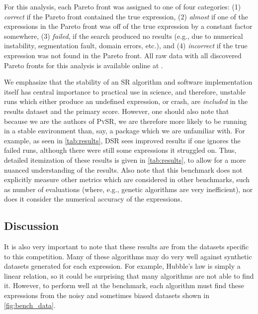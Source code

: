 \documentclass[letterpaper,twocolumn]{scrartcl}
\newcommand\pysr{\textsc{PySR}\xspace}
\begin{document}
\begin{linenumbers}
For this analysis, each Pareto front was assigned to one of four categories: (1) \textit{correct} if the Pareto front contained the true expression, (2) \textit{almost} if one of the expressions in the Pareto front was off of the true expression by a constant factor somewhere, (3) \textit{failed}, if the search produced no results (e.g., due to numerical instability, segmentation fault, domain errors, etc.), and (4) \textit{incorrect} if the true expression was not found in the Pareto front.
All raw data with all discovered Pareto fronts for this analysis is available online at .



We emphasize that the stability of an SR algorithm and software implementation itself has central importance to practical use in science, and therefore, unstable runs which either produce an undefined expression, or crash, are \textit{included} in the results dataset and the primary score.
However, one should also note that because we are the authors of \pysr, we are therefore more likely to be running in a stable environment than, say, a package which we are unfamiliar with.
For example, as seen in \cref{tab:results}, DSR sees improved results if one ignores the failed runs, although there were still some expressions it struggled on.
Thus, detailed itemization of these results is given in \cref{tab:results}, to allow for a more nuanced understanding of the results.
Also note that this benchmark does not explicitly measure other metrics which are considered in other benchmarks, such as number of evaluations (where, e.g., genetic algorithms are very inefficient), nor does it consider the numerical accuracy of the expressions.

\subsection{Discussion}

It is also very important to note that these results are from the datasets specific to this competition.
Many of these algorithms may do very well against synthetic datasets generated for each expression.
For example, Hubble's law is simply a linear relation, so it could be surprising that many algorithms are not able to find it.
However, to perform well at the benchmark, each algorithm must find these expressions from the noisy and sometimes biased datasets shown in \cref{fig:bench_data}.




\end{linenumbers}
\end{document}
